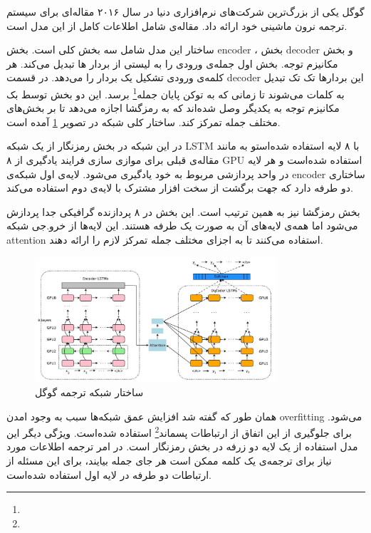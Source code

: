 \documentclass[12pt, a4paper, oneside]{report}
\begin{document}
گوگل یکی از بزرگ‌ترین شرکت‌های نرم‌افزاری دنیا در سال ۲۰۱۶ مقاله‌ای برای سیستم ترجمه نرون ماشینی خود
ارائه داد. مقاله‌ی
\cite{wu2016googles}
شامل اطلاعات کامل از این مدل است.

ساختار این مدل شامل سه بخش کلی است. بخش
encoder
، بخش
decoder
و بخش مکانیزم توجه. بخش اول جمله‌ی ورودی را به لیستی از بردار ها تبدیل می‌کند. هر کلمه‌ی ورودی 
تشکیل یک بردار را می‌دهد. در قسمت
decoder
این بردار‌ها تک تک تبدیل به کلمات می‌شوند تا زمانی که به توکن
پایان جمله\footnote{}
برسد. این دو بخش توسط بک مکانیزم توجه به یکدیگر وصل شده‌اند که به رمزگشا اجازه می‌دهد تا بر بخش‌های
مختلف جمله تمرکز کند. ساختار کلی شبکه در تصویر
\ref{fig:ggl}
آمده است.

در این شبکه در بخش رمزنگار از یک شبکه
LSTM
با ۸ لایه استفاده شده‌استو به مانند مقاله‌ی قبلی برای موازی سازی فرایند یادگیری از ۸
GPU
استفاده شده‌است و هر لایه در واحد پردازشی مربوط به خود یادگیری می‌شود. لایه‌ی اول شبکه‌ی
encoder
ساختاری دو طرفه دارد که جهت برگشت از سخت افزار مشترک با لایه‌ی دوم استفاده می‌کند.

بخش رمزگشا نیز به همین ترتیب است. این بخش در ۸ پردازنده گرافیکی جدا پردازش می‌شود اما همه‌ی لایه‌های
آن به صورت یک طرفه هستند. این لایه‌ها از خرو.جی شبکه
attention
استفاده می‌کنند تا به اجزای مختلف جمله تمرکز لازم را ارائه دهند. 

\begin{figure}[!ht]
    \centering
    \includegraphics[width=0.8\textwidth]{ggl}
    \caption{ ساختار شبکه ترجمه گوگل }
    \label{fig:ggl}
\end{figure}

همان طور که گفته شد افزایش عمق شبکه‌ها سبب به وجود امدن
overfitting
می‌شود. برای جلوگیری از این اتفاق از
ارتباطات پسماند\footnote{}
استفاده شده‌است. ویژگی دیگر این مدل استفاده از یک لایه دو زرفه در بخش رمزنگار است.
در امر ترجمه اطلاعات مورد نیاز برای ترجمه‌ی یک کلمه ممکن است هر جای جمله بیایند، برای این مسئله از
ارتباطات دو طرفه در لایه اول استفاده شده‌است.
\end{document}
